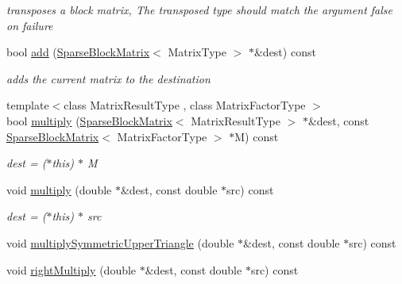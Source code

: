 \begin{DoxyCompactItemize}
\begin{DoxyCompactList}\small\item\em transposes a block matrix, The transposed type should match the argument false on failure \end{DoxyCompactList}\item 
\hypertarget{classg2o_1_1SparseBlockMatrix_a47d026462af0a744cdba6cbf9caa0b3b}{bool \hyperlink{classg2o_1_1SparseBlockMatrix_a47d026462af0a744cdba6cbf9caa0b3b}{add} (\hyperlink{classg2o_1_1SparseBlockMatrix}{Sparse\-Block\-Matrix}$<$ Matrix\-Type $>$ $\ast$\&dest) const }\label{classg2o_1_1SparseBlockMatrix_a47d026462af0a744cdba6cbf9caa0b3b}

\begin{DoxyCompactList}\small\item\em adds the current matrix to the destination \end{DoxyCompactList}\item 
\hypertarget{classg2o_1_1SparseBlockMatrix_a7e37bb74f265c78174fbb5ac9f4df131}{{\footnotesize template$<$class Matrix\-Result\-Type , class Matrix\-Factor\-Type $>$ }\\bool \hyperlink{classg2o_1_1SparseBlockMatrix_a7e37bb74f265c78174fbb5ac9f4df131}{multiply} (\hyperlink{classg2o_1_1SparseBlockMatrix}{Sparse\-Block\-Matrix}$<$ Matrix\-Result\-Type $>$ $\ast$\&dest, const \hyperlink{classg2o_1_1SparseBlockMatrix}{Sparse\-Block\-Matrix}$<$ Matrix\-Factor\-Type $>$ $\ast$M) const }\label{classg2o_1_1SparseBlockMatrix_a7e37bb74f265c78174fbb5ac9f4df131}

\begin{DoxyCompactList}\small\item\em dest = ($\ast$this) $\ast$ M \end{DoxyCompactList}\item 
\hypertarget{classg2o_1_1SparseBlockMatrix_aa0718ac7391b2d88861bc2c9f1b93ab2}{void \hyperlink{classg2o_1_1SparseBlockMatrix_aa0718ac7391b2d88861bc2c9f1b93ab2}{multiply} (double $\ast$\&dest, const double $\ast$src) const }\label{classg2o_1_1SparseBlockMatrix_aa0718ac7391b2d88861bc2c9f1b93ab2}

\begin{DoxyCompactList}\small\item\em dest = ($\ast$this) $\ast$ src \end{DoxyCompactList}\item 
void \hyperlink{classg2o_1_1SparseBlockMatrix_ab162724d457b342e675c535dd78165cd}{multiply\-Symmetric\-Upper\-Triangle} (double $\ast$\&dest, const double $\ast$src) const 
\item 
\hypertarget{classg2o_1_1SparseBlockMatrix_abd3d832d520ccbcdd4cfed817cd55e81}{void \hyperlink{classg2o_1_1SparseBlockMatrix_abd3d832d520ccbcdd4cfed817cd55e81}{right\-Multiply} (double $\ast$\&dest, const double $\ast$src) const }\label{classg2o_1_1SparseBlockMatrix_abd3d832d520ccbcdd4cfed817cd55e81}


\end{DoxyCompactItemize}
